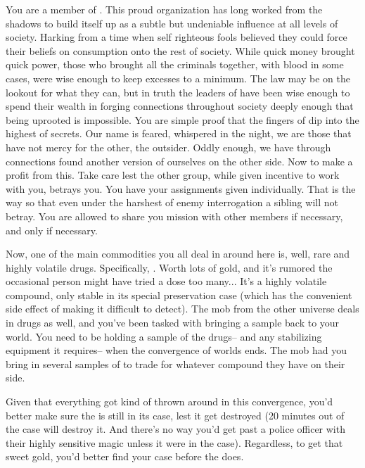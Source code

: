 \documentclass[blue]{guildcamp3}
\begin{document}
\name{\bMagicMob{}}


You are a member of \bMagicMob{}. This proud organization has long worked from the shadows to build itself up as a subtle but undeniable influence at all levels of \bMagicWorld{} society. Harking from a time when self righteous fools believed they could force their beliefs on consumption onto the rest of society. While quick money brought quick power, those who brought all the criminals together, with blood in some cases, were wise enough to keep excesses to a minimum. The law may be on the lookout for what they can, but in truth the leaders of \bMagicMob{} have been wise enough to spend their wealth in forging connections throughout society deeply enough that being uprooted is impossible. You are simple proof that the fingers of \bMagicMob{} dip into the highest of secrets. Our name is feared, whispered in the night, we are those that have not mercy for the other, the outsider. Oddly enough, we have through connections found another version of ourselves on the other side. Now to make a profit from this. Take care lest the other group, while given incentive to work with you, betrays you. You have your assignments given individually. That is the way so that even under the harshest of enemy interrogation a sibling will not betray. You are allowed to share you mission with other members if necessary, and only if necessary.

Now, one of the main commodities you all deal in around here is, well, rare and highly volatile drugs. Specifically, \iDrugsMagic{}. Worth lots of gold, and it's rumored the occasional person might have tried a dose too many... It's a highly volatile compound, only stable in its special preservation case (which has the convenient side effect of making it difficult to detect). The mob from the other universe deals in drugs as well, and you've been tasked with bringing a sample back to your world. You need to be holding a sample of the drugs-- and any stabilizing equipment it requires-- when the convergence of worlds ends. The mob had you bring in several samples of \iDrugsMagic{} to trade for whatever compound they have on their side.

Given that everything got kind of thrown around in this convergence, you'd better make sure the \iDrugsMagic{} is still in its case, lest it get destroyed (20 minutes out of the case will destroy it. And there's no way you'd get past a police officer with their highly sensitive magic unless it were in the case). Regardless, to get that sweet gold, you'd better find your case before the \bTechMob{} does. 
\end{document}

